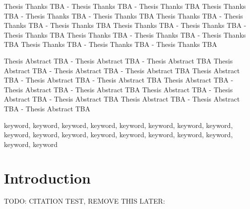 \documentclass[12pt, twoside]{fithesis2}
\renewcommand{\_}{\leavevmode \kern0.07em\vbox{\hrule width0.4em}}
\begin{document}
\FrontMatter
\ThesisTitlePage

%
%
%
%

\begin{ThesisDeclaration}
    \DeclarationText
    \AdvisorName
\end{ThesisDeclaration}

\begin{ThesisThanks}
    Thesis Thanks TBA - Thesis Thanks TBA - Thesis Thanks TBA
    Thesis Thanks TBA - Thesis Thanks TBA - Thesis Thanks TBA
    Thesis Thanks TBA - Thesis Thanks TBA - Thesis Thanks TBA
    Thesis Thanks TBA - Thesis Thanks TBA - Thesis Thanks TBA
    Thesis Thanks TBA - Thesis Thanks TBA - Thesis Thanks TBA
    Thesis Thanks TBA - Thesis Thanks TBA - Thesis Thanks TBA
\end{ThesisThanks}

\begin{ThesisAbstract}
    Thesis Abstract TBA - Thesis Abstract TBA - Thesis Abstract TBA
    Thesis Abstract TBA - Thesis Abstract TBA - Thesis Abstract TBA
    Thesis Abstract TBA - Thesis Abstract TBA - Thesis Abstract TBA
    Thesis Abstract TBA - Thesis Abstract TBA - Thesis Abstract TBA
    Thesis Abstract TBA - Thesis Abstract TBA - Thesis Abstract TBA
    Thesis Abstract TBA - Thesis Abstract TBA - Thesis Abstract TBA
\end{ThesisAbstract}

\begin{ThesisKeyWords}
    keyword, keyword, keyword, keyword, keyword, keyword,
    keyword, keyword, keyword, keyword, keyword, keyword,
    keyword, keyword, keyword, keyword, keyword, keyword
\end{ThesisKeyWords}


\MainMatter
\tableofcontents



\chapter{Introduction}
\label{chap:intro}

TODO: CITATION TEST, REMOVE THIS LATER:

\cite{dg}
\cite{llvm}
\cite{llvm-passes}
\cite{llvm-writing-pass}
\cite{llvm-opt}
\end{document}
